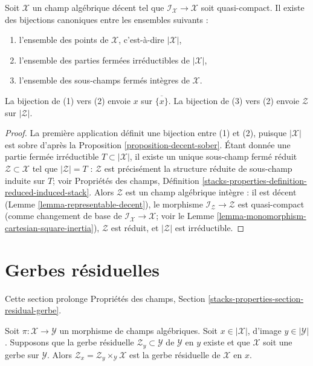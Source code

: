\begin{lemma}
\label{lemma-decent-irreducible-closed}
Soit $\mathcal{X}$ un champ alg\'ebrique d\'ecent tel que
$\mathcal{I}_\mathcal{X} \to \mathcal{X}$ soit quasi-compact.
Il existe des bijections canoniques entre les ensembles suivants :
\begin{enumerate}
\item l'ensemble des points de $\mathcal{X}$, c'est-\`a-dire $|\mathcal{X}|$,
\item l'ensemble des parties ferm\'ees irr\'eductibles de $|\mathcal{X}|$,
\item l'ensemble des sous-champs ferm\'es int\`egres de $\mathcal{X}$.
\end{enumerate}
La bijection de (1) vers (2) envoie $x$ sur $\overline{\{x\}}$.
La bijection de (3) vers (2) envoie $\mathcal{Z}$ sur $|\mathcal{Z}|$.
\end{lemma}

\begin{proof}
La premi\`ere application d\'efinit une bijection entre (1) et (2), puisque
$|\mathcal{X}|$ est sobre d'apr\`es la Proposition \ref{proposition-decent-sober}.
\'Etant donn\'ee une partie ferm\'ee irr\'eductible $T \subset |\mathcal{X}|$,
il existe un unique sous-champ ferm\'e r\'eduit $\mathcal{Z} \subset \mathcal{X}$
tel que $|\mathcal{Z}| = T$ : $\mathcal{Z}$ est pr\'ecis\'ement
la structure r\'eduite de sous-champ induite sur $T$; voir
Propri\'et\'es des champs, D\'efinition
\ref{stacks-properties-definition-reduced-induced-stack}.
Alors $\mathcal{Z}$ est un champ alg\'ebrique int\`egre : il est
d\'ecent (Lemme \ref{lemma-representable-decent}), le
morphisme $\mathcal{I}_\mathcal{Z} \to \mathcal{Z}$ est quasi-compact
(comme changement de base de $\mathcal{I}_\mathcal{X} \to \mathcal{X}$; voir
le Lemme \ref{lemma-monomorphism-cartesian-square-inertia}),
$\mathcal{Z}$ est r\'eduit, et $|\mathcal{Z}|$ est irr\'eductible.
\end{proof}






\section{Gerbes r\'esiduelles}
\label{section-residual-gerbe}

\noindent
Cette section prolonge Propri\'et\'es des champs, Section
\ref{stacks-properties-section-residual-gerbe}.

\begin{lemma}
\label{lemma-gerbe-residual-gerbe}
Soit $\pi : \mathcal{X} \to \mathcal{Y}$ un morphisme de champs alg\'ebriques.
Soit $x \in |\mathcal{X}|$, d'image $y \in |\mathcal{Y}|$.
Supposons que la gerbe r\'esiduelle $\mathcal{Z}_y \subset \mathcal{Y}$
de $\mathcal{Y}$ en $y$ existe et que $\mathcal{X}$ soit une gerbe
sur $\mathcal{Y}$. Alors
$\mathcal{Z}_x = \mathcal{Z}_y \times_\mathcal{Y} \mathcal{X}$ est
la gerbe r\'esiduelle de $\mathcal{X}$ en $x$.
\end{lemma}

